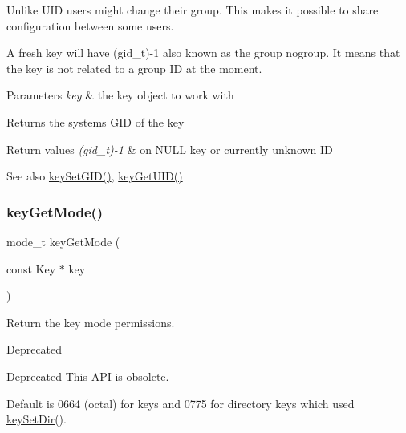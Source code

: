 Unlike U\+ID users might change their group. This makes it possible to share configuration between some users.

A fresh key will have (gid\+\_\+t)-\/1 also known as the group nogroup. It means that the key is not related to a group ID at the moment.


\begin{DoxyParams}{Parameters}
{\em key} & the key object to work with \\
\hline
\end{DoxyParams}
\begin{DoxyReturn}{Returns}
the system\textquotesingle{}s G\+ID of the key 
\end{DoxyReturn}

\begin{DoxyRetVals}{Return values}
{\em (gid\+\_\+t)-\/1} & on N\+U\+LL key or currently unknown ID \\
\hline
\end{DoxyRetVals}
\begin{DoxySeeAlso}{See also}
\mbox{\hyperlink{group__meta_ga9e3d0fb3f7ba906e067727b9155d22e3}{key\+Set\+G\+I\+D()}}, \mbox{\hyperlink{group__meta_gacaa5060e67b03f50ae49a3620c54bc46}{key\+Get\+U\+I\+D()}} 
\end{DoxySeeAlso}
\mbox{\label{group__meta_gabc0cec592ce3b77e9bc33dbc8e8f6bdc}} 
\subsubsection{\texorpdfstring{keyGetMode()}{keyGetMode()}}
{\footnotesize\ttfamily mode\+\_\+t key\+Get\+Mode (\begin{DoxyParamCaption}\item[{const Key $\ast$}]{key }\end{DoxyParamCaption})}



Return the key mode permissions. 

\begin{DoxyRefDesc}{Deprecated}
\item[\mbox{\hyperlink{deprecated__deprecated000019}{Deprecated}}]This A\+PI is obsolete.\end{DoxyRefDesc}


Default is 0664 (octal) for keys and 0775 for directory keys which used \mbox{\hyperlink{group__meta_gaae575bd86a628a15ee45baa860522e75}{key\+Set\+Dir()}}.

